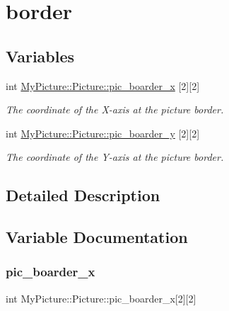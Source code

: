 \hypertarget{group__picture}{}\section{border}
\label{group__picture}
\subsection*{Variables}
\begin{DoxyCompactItemize}
\item 
int \hyperlink{group__picture_gac92ca913b51e02990c1b75ac085d3593}{My\+Picture\+::\+Picture\+::pic\+\_\+boarder\+\_\+x} \mbox{[}2\mbox{]}\mbox{[}2\mbox{]}
\begin{DoxyCompactList}\small\item\em The coordinate of the X-\/axis at the picture border. \end{DoxyCompactList}\item 
int \hyperlink{group__picture_ga062abb41cc6618e8def5f5c4a60603f3}{My\+Picture\+::\+Picture\+::pic\+\_\+boarder\+\_\+y} \mbox{[}2\mbox{]}\mbox{[}2\mbox{]}
\begin{DoxyCompactList}\small\item\em The coordinate of the Y-\/axis at the picture border. \end{DoxyCompactList}\end{DoxyCompactItemize}


\subsection{Detailed Description}


\subsection{Variable Documentation}
\mbox{\label{group__picture_gac92ca913b51e02990c1b75ac085d3593}} 
\subsubsection{\texorpdfstring{pic\+\_\+boarder\+\_\+x}{pic\_boarder\_x}}
{\footnotesize\ttfamily int My\+Picture\+::\+Picture\+::pic\+\_\+boarder\+\_\+x\mbox{[}2\mbox{]}\mbox{[}2\mbox{]}}



